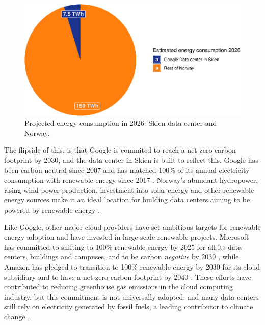 \documentclass[
  table]{report}
\begin{document}
\vspace{0.25cm}

\begin{figure}

{\centering \includegraphics[width=0.8\linewidth]{thesis_files/figure-latex/skienvsnorway-1} 

}

\caption{Projected energy consumption in 2026: Skien data center and Norway.}\label{fig:skienvsnorway}
\end{figure}


The flipside of this, is that Google is commited to reach a net-zero
carbon footprint by 2030, and the data center in Skien is built to
reflect this. Google has been carbon neutral since 2007 and has matched
100\% of its annual electricity consumption with renewable energy since
2017 \citep{googleTrackingOurCarbonFree}. Norway's abundant hydropower,
rising wind power production, investment into solar energy and other
renewable energy sources make it an ideal location for building data
centers aiming to be powered by renewable energy
\citep{norwegian-energyElectricityProduction2023}.

Like Google, other major cloud providers have set ambitious targets for
renewable energy adoption and have invested in large-scale renewable
projects. Microsoft has committed to shifting to 100\% renewable energy
by 2025 for all its data centers, buildings and campuses, and to be
carbon \emph{negative} by 2030 \citep{smithMicrosoftWillBe2020}, while
Amazon has pledged to transition to 100\% renewable energy by 2030 for
its cloud subsidiary and to have a net-zero carbon footprint by 2040
\citep{amazonClimatePledge2019}. These efforts have contributed to
reducing greenhouse gas emissions in the cloud computing industry, but
this commitment is not universally adopted, and many data centers still
rely on electricity generated by fossil fuels, a leading contributor to
climate change \citep{mytton2020}.
\end{document}
